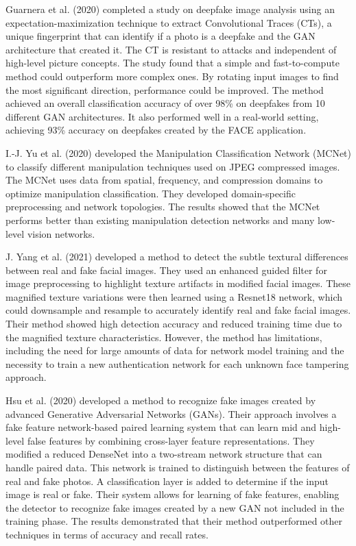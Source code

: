 Guarnera et al. (2020) \cite{guarnera2020fighting} completed a study on deepfake image analysis using an expectation-maximization technique to extract Convolutional Traces (CTs), a unique fingerprint that can identify if a photo is a deepfake and the GAN architecture that created it. The CT is resistant to attacks and independent of high-level picture concepts. The study found that a simple and fast-to-compute method could outperform more complex ones. By rotating input images to find the most significant direction, performance could be improved. The method achieved an overall classification accuracy of over 98\% on deepfakes from 10 different GAN architectures. It also performed well in a real-world setting, achieving 93\% accuracy on deepfakes created by the FACE application.

I.-J. Yu et al. (2020) \cite{yu2020manipulation} developed the Manipulation Classification Network (MCNet) to classify different manipulation techniques used on JPEG compressed images. The MCNet uses data from spatial, frequency, and compression domains to optimize manipulation classification. They developed domain-specific preprocessing and network topologies. The results showed that the MCNet performs better than existing manipulation detection networks and many low-level vision networks.

J. Yang et al. (2021) \cite{yang2021detecting}developed a method to detect the subtle textural differences between real and fake facial images. They used an enhanced guided filter for image preprocessing to highlight texture artifacts in modified facial images. These magnified texture variations were then learned using a Resnet18 network, which could downsample and resample to accurately identify real and fake facial images. Their method showed high detection accuracy and reduced training time due to the magnified texture characteristics. However, the method has limitations, including the need for large amounts of data for network model training and the necessity to train a new authentication network for each unknown face tampering approach.

Hsu et al. (2020) \cite{hung2021multi} developed a method to recognize fake images created by advanced Generative Adversarial Networks (GANs). Their approach involves a fake feature network-based paired learning system that can learn mid and high-level false features by combining cross-layer feature representations. They modified a reduced DenseNet into a two-stream network structure that can handle paired data. This network is trained to distinguish between the features of real and fake photos. A classification layer is added to determine if the input image is real or fake. Their system allows for learning of fake features, enabling the detector to recognize fake images created by a new GAN not included in the training phase. The results demonstrated that their method outperformed other techniques in terms of accuracy and recall rates.

